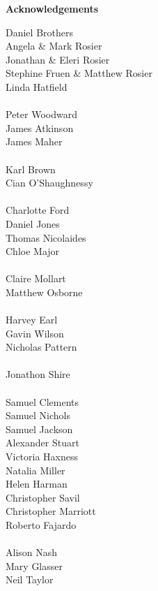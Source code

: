 \thispagestyle{empty}

\begin{center}
    {\LARGE\bf Acknowledgements}
\end{center}
Daniel Brothers\\
Angela \& Mark Rosier\\
Jonathan \& Eleri Rosier\\
Stephine Fruen \& Matthew Rosier\\
Linda Hatfield\\
\\
Peter Woodward\\
James Atkinson\\
James Maher\\
\\
Karl Brown\\
Cian O'Shaughnessy\\
\\
Charlotte Ford\\
Daniel Jones\\
Thomas Nicolaides\\
Chloe Major\\
\\
Claire Mollart\\
Matthew Osborne\\
\\
Harvey Earl\\
Gavin Wilson\\
Nicholas Pattern\\
\\
Jonathon Shire\\
\\
Samuel Clements\\
Samuel Nichols\\
Samuel Jackson\\
Alexander Stuart\\
Victoria Haxness\\
Natalia Miller\\
Helen Harman\\
Christopher Savil\\
Christopher Marriott\\
Roberto Fajardo\\
\\
Alison Nash\\
Mary Glasser\\
Neil Taylor\\
